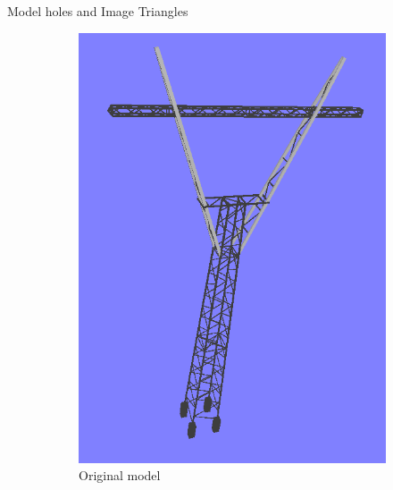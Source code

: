 \documentclass{beamer}
\begin{document}
\begin{frame}[t, fragile]{Model holes and Image Triangles}
\begin{figure}
\centering
\begin{subfigure}{.5\textwidth}
\centering
\includegraphics[scale=0.22]{3d_model}
\caption{Original model}
\end{subfigure}%
\begin{subfigure}{.5\textwidth}
\centering

\end{subfigure}
\end{figure}
\end{frame}
\end{document}

